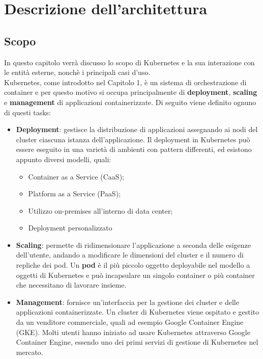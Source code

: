 \documentclass[12pt, a4paper]{report}
\begin{document}
\chapter{Descrizione dell'architettura}
\section{Scopo}
In questo capitolo verrà discusso lo scopo di Kubernetes e la sua interazione con le entità esterne, nonchè i principali casi d'uso. \\
Kubernetes, come introdotto nel Capitolo 1, è un sistema di orchestrazione di container e per questo motivo si occupa principalmente di \textbf{deployment}, \textbf{scaling} e \textbf{management} di applicazioni containerizzate. Di seguito viene definito ognuno di questi tasks:
\begin{itemize}
\item \textbf{Deployment}: gestisce la distribuzione di applicazioni assegnando ai nodi del cluster ciascuna istanza dell'applicazione. Il deployment in Kubernetes può essere eseguito in una varietà di ambienti con pattern differenti, ed esistono appunto diversi modelli, quali:
\begin{itemize}
  \item Container as a Service (CaaS);
  \item Platform as a Service (PaaS);
  \item Utilizzo on-premises all'interno di data center;
  \item Deployment personalizzato
\end{itemize}
\item \textbf{Scaling}: permette di ridimensionare l'applicazione a seconda delle esigenze dell'utente, andando a modificare le dimensioni del cluster e il numero di repliche dei pod. Un \textbf{pod} è il più piccolo oggetto deployabile nel modello a oggetti di Kubernetes e può incapsulare un singolo container o più container che necessitano di lavorare insieme.
\item \textbf{Management}: fornisce un'interfaccia per la gestione dei cluster e delle applicazioni containerizzate. Un cluster di Kubernetes viene ospitato e gestito da un venditore commerciale, quali ad esempio Google Container Engine (GKE). Molti utenti hanno iniziato ad usare Kubernetes attraverso Google Container Engine, essendo uno dei primi servizi di gestione di Kubernetes nel mercato.
\end{itemize}
\end{document}
